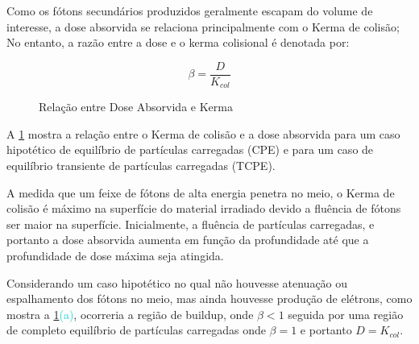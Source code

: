 \documentclass[11pt,a4paper]{article}
\begin{document}
		Como os fótons secundários produzidos geralmente escapam do volume de interesse, a dose absorvida se relaciona principalmente com o Kerma de colisão; No entanto, a razão entre a dose e o kerma colisional é denotada por:

		\begin{equation}
			\beta = \frac{D}{K_{col}}
		\end{equation}

		\begin{figure}
			\centering
			\caption{Relação entre Dose Absorvida e Kerma}
			\label{fig:relacaoKermaEDose}
		\end{figure}
		
		A   \ref{fig:relacaoKermaEDose} mostra a relação entre o Kerma de colisão e a dose absorvida para um caso hipotético de equilíbrio de partículas carregadas (CPE) e para um caso de equilíbrio transiente de partículas carregadas (TCPE).

		A medida que um feixe de fótons de alta energia penetra no meio, o Kerma de colisão é máximo na superfície do material irradiado devido a fluência de fótons ser maior na superfície. Inicialmente, a fluência de partículas carregadas, e portanto a dose absorvida aumenta em função da profundidade até que a profundidade de dose máxima seja atingida.

		Considerando um caso hipotético no qual não houvesse atenuação ou espalhamento dos fótons no meio, mas ainda houvesse produção de elétrons, como mostra a   \ref{fig:relacaoKermaEDose}\textcolor{DarkTurquoise}{(a)}, ocorreria a região de buildup, onde $\beta < 1$ seguida por uma região de completo equilíbrio de partículas carregadas onde $\beta = 1$ e portanto $D = K_{col}$.
\end{document}
